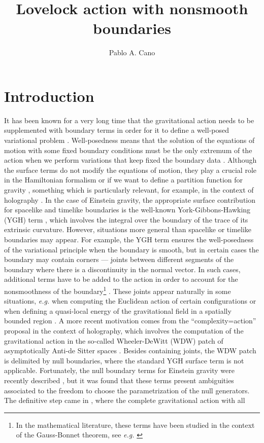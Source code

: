 \documentclass[11pt,letterpaper]{article}
\title{Lovelock action with nonsmooth boundaries}
\author[a,b]{Pablo A. Cano}
\affiliation[a]{Instituto de F\'isica Te\'orica UAM/CSIC,\\C/ Nicol\'as Cabrera, 13-15, C.U. Cantoblanco, 28049 Madrid, Spain}
\affiliation[b]{Perimeter Institute for Theoretical Physics, Waterloo, ON N2L 2Y5, Canada}
\begin{document}
\maketitle

%
%
%
%
%

\section{Introduction}
It has been known for a very long time that the gravitational action needs to be supplemented with boundary terms in order for it to define a well-posed variational problem \cite{York:1972sj,Gibbons:1976ue}. Well-posedness means that the solution of the equations of motion with some fixed boundary conditions must be the only extremum of the action when we perform variations that keep fixed the boundary data \cite{Dyer:2008hb}.  Although the surface terms do not modify the equations of motion, they play a crucial role in the Hamiltonian formalism \cite{Hawking:1995fd} or if we want to define a partition function for gravity \cite{Gibbons:1976ue}, something which is particularly relevant, for example, in the context of holography \cite{Maldacena, Witten, Gubser}. In the case of Einstein gravity, the appropriate surface contribution for spacelike and timelike boundaries is the well-known York-Gibbons-Hawking (YGH) term \cite{York:1972sj,Gibbons:1976ue}, which involves the integral over the boundary of the trace of its extrinsic curvature. However, situations more general than spacelike or timelike boundaries may appear. For example, the YGH term ensures the well-posedness of the variational principle when the boundary is smooth, but in certain cases the boundary may contain corners --- joints between different segments of the boundary where there is a discontinuity in the normal vector. In such cases, additional terms have to be added to the action in order to account for the nonsmoothness of the boundary\footnote{In the mathematical literature, these terms have been studied in the context of the Gauss-Bonnet theorem, see {\it e.g.} \cite{Jee1984,10.2307/44237512,birman1984} } \cite{Hartle:1981cf,Hayward:1993my}. These joints appear naturally in some situations, \textit{e.g.} when computing the Euclidean action of certain configurations \cite{Brill:1991rw, Hawking:1994ii,Gibbons:1994ff,FARHI1990417} or when defining a quasi-local energy of the gravitational field in a spatially bounded region \cite{BROWN2002175,PhysRevD.47.1407}. A more recent motivation comes from the ``complexity=action'' proposal \cite{Brown:2015bva,Brown:2015lvg} in the context of holography, which involves the computation of the gravitational action in the so-called Wheeler-DeWitt (WDW) patch of asymptotically Anti-de Sitter spaces \cite{Carmi:2016wjl}. Besides containing joints, the WDW patch is delimited by null boundaries, where the standard YGH surface term is not applicable. Fortunately, the null boundary terms for Einstein gravity were recently described \cite{Neiman:2012fx, Parattu:2015gga}, but it was found that these terms present ambiguities associated to the freedom to choose the parametrization of the null generators. The definitive step came in \cite{Lehner:2016vdi}, where the complete gravitational action with all 
\end{document}
